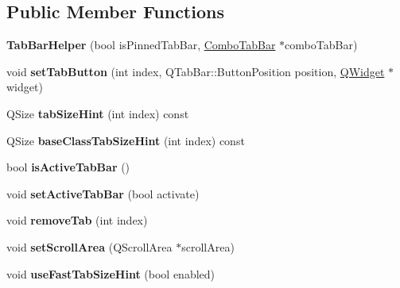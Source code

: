 \subsection*{Public Member Functions}
\begin{DoxyCompactItemize}
\item 
\hypertarget{class_tab_bar_helper_af9ced889c0be86aefa08d77a70a44bdd}{
{\bfseries TabBarHelper} (bool isPinnedTabBar, \hyperlink{class_combo_tab_bar}{ComboTabBar} $\ast$comboTabBar)}
\label{class_tab_bar_helper_af9ced889c0be86aefa08d77a70a44bdd}

\item 
\hypertarget{class_tab_bar_helper_a28baa6185f46e5db6880ae25a2802307}{
void {\bfseries setTabButton} (int index, QTabBar::ButtonPosition position, \hyperlink{class_q_widget}{QWidget} $\ast$widget)}
\label{class_tab_bar_helper_a28baa6185f46e5db6880ae25a2802307}

\item 
\hypertarget{class_tab_bar_helper_a730752cb66f05baea1796c694051cb0a}{
QSize {\bfseries tabSizeHint} (int index) const }
\label{class_tab_bar_helper_a730752cb66f05baea1796c694051cb0a}

\item 
\hypertarget{class_tab_bar_helper_ac33cf816a8ed021905044dc04d823c4e}{
QSize {\bfseries baseClassTabSizeHint} (int index) const }
\label{class_tab_bar_helper_ac33cf816a8ed021905044dc04d823c4e}

\item 
\hypertarget{class_tab_bar_helper_abcc45aacfb483444d03f1c9bf3b9ea6f}{
bool {\bfseries isActiveTabBar} ()}
\label{class_tab_bar_helper_abcc45aacfb483444d03f1c9bf3b9ea6f}

\item 
\hypertarget{class_tab_bar_helper_aa93e42dcc138bf87905524ec854bfc3b}{
void {\bfseries setActiveTabBar} (bool activate)}
\label{class_tab_bar_helper_aa93e42dcc138bf87905524ec854bfc3b}

\item 
\hypertarget{class_tab_bar_helper_ae3b64c247a7953682dd1fc53b784d5dc}{
void {\bfseries removeTab} (int index)}
\label{class_tab_bar_helper_ae3b64c247a7953682dd1fc53b784d5dc}

\item 
\hypertarget{class_tab_bar_helper_a11e0dba4a8d1547a2b0ed4898a2573ef}{
void {\bfseries setScrollArea} (QScrollArea $\ast$scrollArea)}
\label{class_tab_bar_helper_a11e0dba4a8d1547a2b0ed4898a2573ef}

\item 
\hypertarget{class_tab_bar_helper_a3dd9da07487a7549d69c80380fc83951}{
void {\bfseries useFastTabSizeHint} (bool enabled)}
\label{class_tab_bar_helper_a3dd9da07487a7549d69c80380fc83951}


\end{DoxyCompactItemize}
